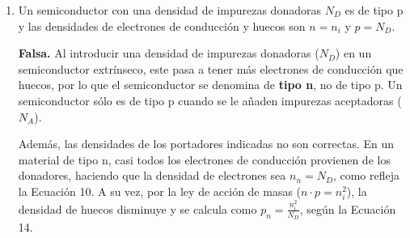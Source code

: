 \documentclass[11pt, a4paper]{article}
\newenvironment{problem}[1][Cuestión]{
	\vspace{0.5cm}
	\noindent{\Large\bfseries #1} \par\vspace{0.5cm}
}{
	\vspace{0.5cm}
}
\begin{document}
\begin{problem}[Cuestión 6]
\begin{enumerate}[label=\alph*)]
{					Como la energía del fotón incidente ($1,034 \text{ eV}$) es inferior a la energía del gap del silicio ($E_g = 1,12 \text{ eV}$), no se crearán pares $e^- - h^+$ y, en consecuencia, este fotodetector de silicio no podrá detectar luz a $1200 \text{ nm}$.
				}

			\item Un semiconductor con una densidad de impurezas donadoras $N_D$ es de tipo p y las densidades de electrones de conducción y huecos son $n = n_i$ y $p = N_D$.

				{ \color{blue} 
					\textbf{Falsa.} Al introducir una densidad de impurezas donadoras ($N_D$) en un semiconductor extrínseco, este pasa a tener más electrones de conducción que huecos, por lo que el semiconductor se denomina de \textbf{tipo n}, no de tipo p. Un semiconductor sólo es de tipo p cuando se le añaden impurezas aceptadoras ($N_A$).

					Además, las densidades de los portadores indicadas no son correctas. En un material de tipo n, casi todos los electrones de conducción provienen de los donadores, haciendo que la densidad de electrones sea $n_n = N_D$, como refleja la Ecuación 10. A su vez, por la ley de acción de masas ($n \cdot p = n_i^2$), la densidad de huecos disminuye y se calcula como $p_n = \frac{n_i^2}{N_D}$, según la Ecuación 14.
				}
		\end{enumerate}
	\end{problem}
\end{document}
